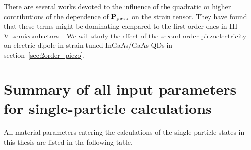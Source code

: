 There are several works devoted to the influence of the quadratic or higher contributions of the dependence of $\mathbf{P}_{{\rm piezo}}$ on the strain tensor. They have found that these terms might be dominating compared to the first order-ones in III-V~semiconductors~\citep{Bester,Bester:06,Beya-Wakata2011}. We will study the effect of the second order piezoelectricity on electric dipole in strain-tuned InGaAs/GaAs QDs in section~\ref{sec:2order_piezo}.














\section{Summary of all input parameters for single-particle calculations}
\label{Secsumparam}

All material parameters entering the calculations of the single-particle states in this thesis are listed in the following table.

